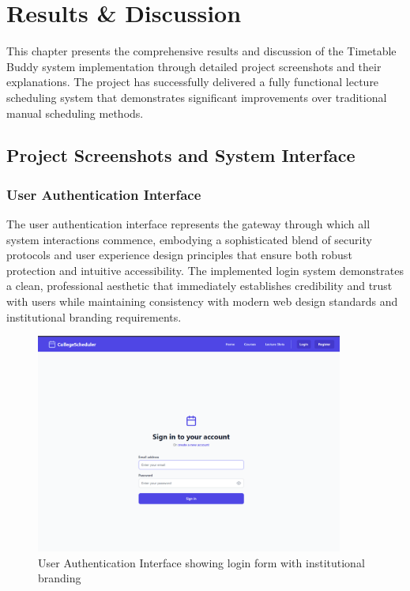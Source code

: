 \chapter{Results \& Discussion}

This chapter presents the comprehensive results and discussion of the Timetable Buddy system implementation through detailed project screenshots and their explanations. The project has successfully delivered a fully functional lecture scheduling system that demonstrates significant improvements over traditional manual scheduling methods.

\section{Project Screenshots and System Interface}

\subsection{User Authentication Interface}

The user authentication interface represents the gateway through which all system interactions commence, embodying a sophisticated blend of security protocols and user experience design principles that ensure both robust protection and intuitive accessibility. The implemented login system demonstrates a clean, professional aesthetic that immediately establishes credibility and trust with users while maintaining consistency with modern web design standards and institutional branding requirements.

\begin{figure}[htbp]
    \centering
    \includegraphics[width=0.9\textwidth]{images/Screenshot of Login Page.png}
    \caption{User Authentication Interface showing login form with institutional branding}
    \label{fig:login_page}
\end{figure}

